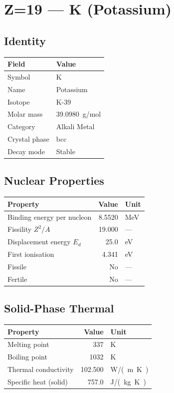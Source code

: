\documentclass[11pt,a4paper]{article}
\begin{document}
\newpage

\section{Z=19 --- K (Potassium)}
\label{sec:Z19}

\subsection{Identity}
\begin{tabular}{ll}
  \toprule
  Field & Value \\
  \midrule
  Symbol & K \\
  Name & Potassium \\
  Isotope & K-39 \\
  Molar mass & \SI{39.0980}{g/mol} \\
  Category & Alkali Metal \\
  Crystal phase & bcc \\
  Decay mode & Stable \\
  \bottomrule
\end{tabular}

\subsection{Nuclear Properties}
\begin{tabular}{lrl}
  \toprule
  Property & Value & Unit \\
  \midrule
  Binding energy per nucleon & 8.5520 & \si{MeV} \\
  Fissility $Z^2/A$ & 19.000 & --- \\
  Displacement energy $E_d$ & 25.0 & \si{eV} \\
  First ionisation & 4.341 & \si{eV} \\
  Fissile & No & --- \\
  Fertile & No & --- \\
  \bottomrule
\end{tabular}

\subsection{Solid-Phase Thermal}
\begin{tabular}{lrl}
  \toprule
  Property & Value & Unit \\
  \midrule
  Melting point & 337 & \si{K} \\
  Boiling point & 1032 & \si{K} \\
  Thermal conductivity & 102.500 & \si{W/(m.K)} \\
  Specific heat (solid) & 757.0 & \si{J/(kg.K)} \\
  \bottomrule
\end{tabular}
\end{document}
